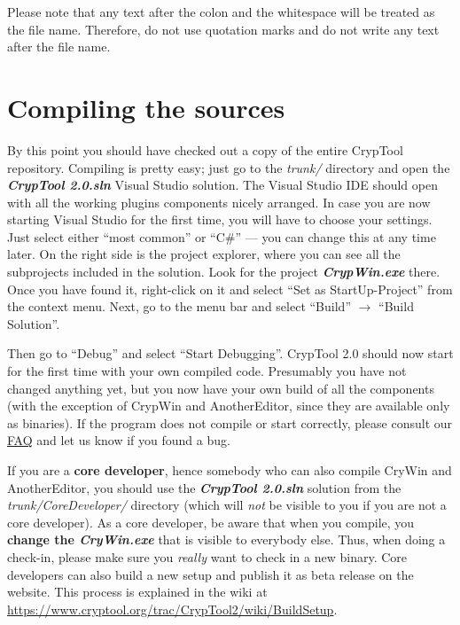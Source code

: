 \begin{center}
\end{center}

Please note that any text after the colon and the whitespace will be treated as the file name. Therefore, do not use quotation marks and do not write any text after the file name.
\clearpage

\section{Compiling the sources}
\label{CompilingTheSources}

By this point you should have checked out a copy of the entire CrypTool repository. Compiling is pretty easy; just go to the \textit{trunk/} directory and open the \textbf{\textit{CrypTool 2.0.sln}} Visual Studio solution. The Visual Studio IDE should open with all the working plugins components nicely arranged. In case you are now starting Visual Studio for the first time, you will have to choose your settings. Just select either ``most common'' or ``C\#'' --- you can change this at any time later. On the right side is the project explorer, where you can see all the subprojects included in the solution. Look for the project \textbf{\textit{CrypWin.exe}} there. Once you have found it, right-click on it and select ``Set as StartUp-Project'' from the context menu. Next, go to the menu bar and select ``Build'' $\rightarrow$ ``Build Solution''.

Then go to ``Debug'' and select ``Start Debugging''. CrypTool 2.0 should now start for the first time with your own compiled code. Presumably you have not changed anything yet, but you now have your own build of all the components (with the exception of CrypWin and AnotherEditor, since they are available only as binaries). If the program does not compile or start correctly, please consult our \href{https://www.cryptool.org/trac/CrypTool2/wiki/FAQ}{FAQ} and let us know if you found a bug.

If you are a \textbf{core developer}, hence somebody who can also compile CryWin and AnotherEditor, you should use the \textbf{\textit{CrypTool 2.0.sln}} solution from the \textit{trunk/CoreDeveloper/} directory (which will \textit{not} be visible to you if you are not a core developer). As a core developer, be aware that when you compile, you \textbf{change the \textit{CryWin.exe}} that is visible to everybody else. Thus, when doing a check-in, please make sure you \textit{really} want to check in a new binary. Core developers can also build a new setup and publish it as beta release on the website. This process is explained in the wiki at \url{https://www.cryptool.org/trac/CrypTool2/wiki/BuildSetup}.